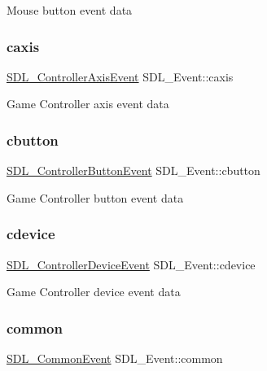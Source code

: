 Mouse button event data \mbox{\label{union_s_d_l___event_aa8f6df0f2716fae56204b12ab4a4c289}} 
\subsubsection{\texorpdfstring{caxis}{caxis}}
{\footnotesize\ttfamily \mbox{\hyperlink{struct_s_d_l___controller_axis_event}{S\+D\+L\+\_\+\+Controller\+Axis\+Event}} S\+D\+L\+\_\+\+Event\+::caxis}

Game Controller axis event data \mbox{\label{union_s_d_l___event_aee2b5671c8dcdb447023715cc21593cb}} 
\subsubsection{\texorpdfstring{cbutton}{cbutton}}
{\footnotesize\ttfamily \mbox{\hyperlink{struct_s_d_l___controller_button_event}{S\+D\+L\+\_\+\+Controller\+Button\+Event}} S\+D\+L\+\_\+\+Event\+::cbutton}

Game Controller button event data \mbox{\label{union_s_d_l___event_ad3beed01e690b885728e0b0e1d636378}} 
\subsubsection{\texorpdfstring{cdevice}{cdevice}}
{\footnotesize\ttfamily \mbox{\hyperlink{struct_s_d_l___controller_device_event}{S\+D\+L\+\_\+\+Controller\+Device\+Event}} S\+D\+L\+\_\+\+Event\+::cdevice}

Game Controller device event data \mbox{\label{union_s_d_l___event_abe5cb8767f93de55163c8ddd4562a7f2}} 
\subsubsection{\texorpdfstring{common}{common}}
{\footnotesize\ttfamily \mbox{\hyperlink{struct_s_d_l___common_event}{S\+D\+L\+\_\+\+Common\+Event}} S\+D\+L\+\_\+\+Event\+::common}

